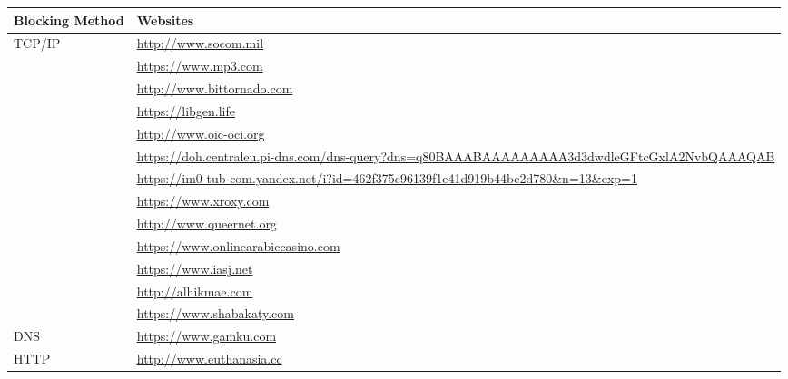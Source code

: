 \begin{tabular}{ll}
\toprule
\textbf{Blocking Method} & \textbf{Websites} \\
\midrule
TCP/IP & \url{http://www.socom.mil} \\
       & \url{https://www.mp3.com} \\
       & \url{http://www.bittornado.com} \\
       & \url{https://libgen.life} \\
       & \url{http://www.oic-oci.org} \\
       & \url{https://doh.centraleu.pi-dns.com/dns-query?dns=q80BAAABAAAAAAAAA3d3dwdleGFtcGxlA2NvbQAAAQAB} \\
       & \url{https://im0-tub-com.yandex.net/i?id=462f375c96139f1e41d919b44be2d780\&n=13\&exp=1} \\
       & \url{https://www.xroxy.com} \\
       & \url{http://www.queernet.org} \\
       & \url{https://www.onlinearabiccasino.com} \\
       & \url{https://www.iasj.net} \\
       & \url{http://alhikmae.com} \\
       & \url{https://www.shabakaty.com} \\
\midrule
DNS    & \url{https://www.gamku.com} \\
\midrule
HTTP   & \url{http://www.euthanasia.cc} \\
\bottomrule
\end{tabular}




